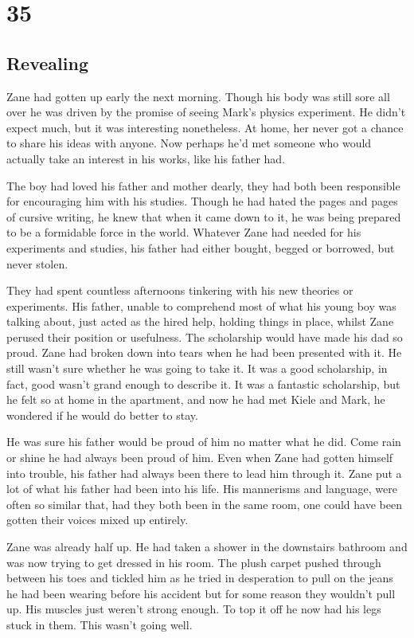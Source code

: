 \chapter{35}
\section{Revealing}


Zane had gotten up early the next morning.  Though his body was still sore all over he was driven by the promise of seeing Mark's physics experiment.  He didn't expect much, but it was interesting nonetheless.  At home, her never got a chance to share his ideas with anyone.  Now perhaps he'd met someone who would actually take an interest in his works, like his father had.

The boy had loved his father and mother dearly, they had both been responsible for encouraging him with his studies.  Though he had hated the pages and pages of cursive writing, he knew that when it came down to it, he was being prepared to be a formidable force in the world.  Whatever Zane had needed for his experiments and studies, his father had either bought, begged or borrowed, but never stolen.

They had spent countless afternoons tinkering with his new theories or experiments.  His father, unable to comprehend most of what his young boy was talking about, just acted as the hired help, holding things in place, whilst Zane perused their position or usefulness.  The scholarship would have made his dad so proud.  Zane had broken down into tears when he had been presented with it.  He still wasn't sure whether he was going to take it.  It was a good scholarship, in fact, good wasn't grand enough to describe it.  It was a fantastic scholarship, but he felt so at home in the apartment, and now he had met Kiele and Mark, he wondered if he would do better to stay.

He was sure his father would be proud of him no matter what he did.  Come rain or shine he had always been proud of him.  Even when Zane had gotten himself into trouble, his father had always been there to lead him through it.  Zane put a lot of what his father had been into his life.  His mannerisms and language, were often so similar that, had they both been in the same room, one could have been gotten their voices mixed up entirely.

Zane was already half up.  He had taken a shower in the downstairs bathroom and was now trying to get dressed in his room.  The plush carpet pushed through between his toes and tickled him as he tried in desperation to pull on the jeans he had been wearing before his accident but for some reason they wouldn't pull up.  His muscles just weren't strong enough.  To top it off he now had his legs stuck in them.  This wasn't going well.

